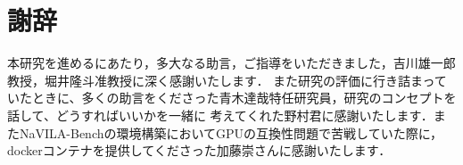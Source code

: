 \chapter*{謝辞}

本研究を進めるにあたり，多大なる助言，ご指導をいただきました，吉川雄一郎教授，堀井隆斗准教授に深く感謝いたします．
また研究の評価に行き詰まっていたときに、多くの助言をくださった青木達哉特任研究員，研究のコンセプトを話して、どうすればいいかを一緒に
考えてくれた野村君に感謝いたします．またNaVILA-Benchの環境構築においてGPUの互換性問題で苦戦していた際に，
dockerコンテナを提供してくださった加藤崇さんに感謝いたします．
